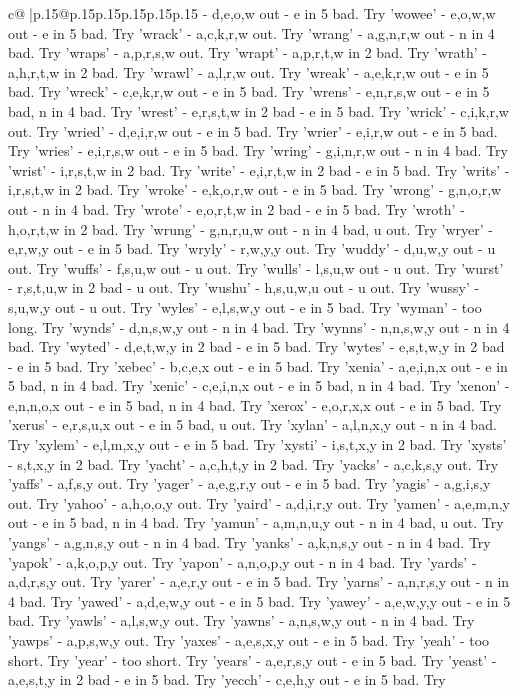 \documentclass{article}
\begin{document}
{\begin{supertabular}{c@{$\;$}|p{.15\linewidth}@{}p{.15\linewidth}p{.15\linewidth}p{.15\linewidth}p{.15\linewidth}p{.15\linewidth}}
{{{{-} d,e,o,w out {-} e in 5 bad. Try 'wowee' {-} e,o,w,w out {-} e in 5 bad. Try 'wrack' {-} a,c,k,r,w out. Try 'wrang' {-} a,g,n,r,w out {-} n in 4 bad. Try 'wraps' {-} a,p,r,s,w out. Try 'wrapt' {-} a,p,r,t,w in 2 bad. Try 'wrath' {-} a,h,r,t,w in 2 bad. Try 'wrawl' {-} a,l,r,w out. Try 'wreak' {-} a,e,k,r,w out {-} e in 5 bad. Try 'wreck' {-} c,e,k,r,w out {-} e in 5 bad. Try 'wrens' {-} e,n,r,s,w out {-} e in 5 bad, n in 4 bad. Try 'wrest' {-} e,r,s,t,w in 2 bad {-} e in 5 bad. Try 'wrick' {-} c,i,k,r,w out. Try 'wried' {-} d,e,i,r,w out {-} e in 5 bad. Try 'wrier' {-} e,i,r,w out {-} e in 5 bad. Try 'wries' {-} e,i,r,s,w out {-} e in 5 bad. Try 'wring' {-} g,i,n,r,w out {-} n in 4 bad. Try 'wrist' {-} i,r,s,t,w in 2 bad. Try 'write' {-} e,i,r,t,w in 2 bad {-} e in 5 bad. Try 'writs' {-} i,r,s,t,w in 2 bad. Try 'wroke' {-} e,k,o,r,w out {-} e in 5 bad. Try 'wrong' {-} g,n,o,r,w out {-} n in 4 bad. Try 'wrote' {-} e,o,r,t,w in 2 bad {-} e in 5 bad. Try 'wroth' {-} h,o,r,t,w in 2 bad. Try 'wrung' {-} g,n,r,u,w out {-} n in 4 bad, u out. Try 'wryer' {-} e,r,w,y out {-} e in 5 bad. Try 'wryly' {-} r,w,y,y out. Try 'wuddy' {-} d,u,w,y out {-} u out. Try 'wuffs' {-} f,s,u,w out {-} u out. Try 'wulls' {-} l,s,u,w out {-} u out. Try 'wurst' {-} r,s,t,u,w in 2 bad {-} u out. Try 'wushu' {-} h,s,u,w,u out {-} u out. Try 'wussy' {-} s,u,w,y out {-} u out. Try 'wyles' {-} e,l,s,w,y out {-} e in 5 bad. Try 'wyman' {-} too long. Try 'wynds' {-} d,n,s,w,y out {-} n in 4 bad. Try 'wynns' {-} n,n,s,w,y out {-} n in 4 bad. Try 'wyted' {-} d,e,t,w,y in 2 bad {-} e in 5 bad. Try 'wytes' {-} e,s,t,w,y in 2 bad {-} e in 5 bad. Try 'xebec' {-} b,c,e,x out {-} e in 5 bad. Try 'xenia' {-} a,e,i,n,x out {-} e in 5 bad, n in 4 bad. Try 'xenic' {-} c,e,i,n,x out {-} e in 5 bad, n in 4 bad. Try 'xenon' {-} e,n,n,o,x out {-} e in 5 bad, n in 4 bad. Try 'xerox' {-} e,o,r,x,x out {-} e in 5 bad. Try 'xerus' {-} e,r,s,u,x out {-} e in 5 bad, u out. Try 'xylan' {-} a,l,n,x,y out {-} n in 4 bad. Try 'xylem' {-} e,l,m,x,y out {-} e in 5 bad. Try 'xysti' {-} i,s,t,x,y in 2 bad. Try 'xysts' {-} s,t,x,y in 2 bad. Try 'yacht' {-} a,c,h,t,y in 2 bad. Try 'yacks' {-} a,c,k,s,y out. Try 'yaffs' {-} a,f,s,y out. Try 'yager' {-} a,e,g,r,y out {-} e in 5 bad. Try 'yagis' {-} a,g,i,s,y out. Try 'yahoo' {-} a,h,o,o,y out. Try 'yaird' {-} a,d,i,r,y out. Try 'yamen' {-} a,e,m,n,y out {-} e in 5 bad, n in 4 bad. Try 'yamun' {-} a,m,n,u,y out {-} n in 4 bad, u out. Try 'yangs' {-} a,g,n,s,y out {-} n in 4 bad. Try 'yanks' {-} a,k,n,s,y out {-} n in 4 bad. Try 'yapok' {-} a,k,o,p,y out. Try 'yapon' {-} a,n,o,p,y out {-} n in 4 bad. Try 'yards' {-} a,d,r,s,y out. Try 'yarer' {-} a,e,r,y out {-} e in 5 bad. Try 'yarns' {-} a,n,r,s,y out {-} n in 4 bad. Try 'yawed' {-} a,d,e,w,y out {-} e in 5 bad. Try 'yawey' {-} a,e,w,y,y out {-} e in 5 bad. Try 'yawls' {-} a,l,s,w,y out. Try 'yawns' {-} a,n,s,w,y out {-} n in 4 bad. Try 'yawps' {-} a,p,s,w,y out. Try 'yaxes' {-} a,e,s,x,y out {-} e in 5 bad. Try 'yeah' {-} too short. Try 'year' {-} too short. Try 'years' {-} a,e,r,s,y out {-} e in 5 bad. Try 'yeast' {-} a,e,s,t,y in 2 bad {-} e in 5 bad. Try 'yecch' {-} c,e,h,y out {-} e in 5 bad. Try }}}
\end{supertabular}}
\end{document}

